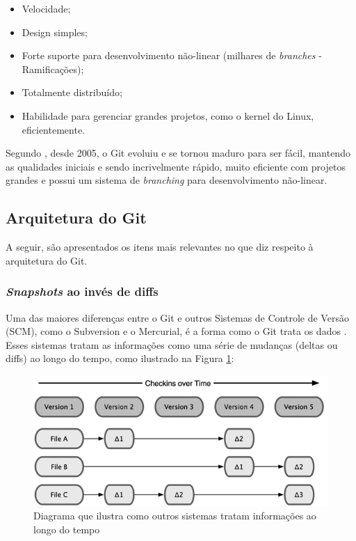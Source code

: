 \begin{itemize}
	\item Velocidade;
	\item Design simples;
	\item Forte suporte para desenvolvimento não-linear (milhares de \emph{branches} - Ramificações);
	\item Totalmente distribuído;
	\item Habilidade para gerenciar grandes projetos, como o kernel do Linux, eficientemente.
\end{itemize}


Segundo \cite{progit}, desde 2005, o Git evoluiu e se tornou maduro para ser fácil, mantendo as qualidades iniciais e sendo incrivelmente rápido, muito eficiente com projetos grandes e possui um sistema de \emph{branching} para desenvolvimento não-linear.

\subsection{Arquitetura do Git}

A seguir, são apresentados os itens mais relevantes no que diz respeito à arquitetura do Git.

\subsubsection{\emph{Snapshots} ao invés de diffs}

Uma das maiores diferenças entre o Git e outros Sistemas de Controle de Versão (SCM), como o Subversion e o Mercurial, é a forma como o Git trata os dados \cite[p. 6]{progit}. Esses sistemas tratam as informações como uma série de mudanças (deltas ou diffs) ao longo do tempo, como ilustrado na Figura \ref{scm_delta}:

\begin{figure} [ht]
	\centering
	\includegraphics[scale=0.5]{scm_delta.png}
	\caption{Diagrama que ilustra como outros sistemas tratam informações ao longo do tempo\cite[p. 6]{progit}}
	\label{scm_delta}
\end{figure}

